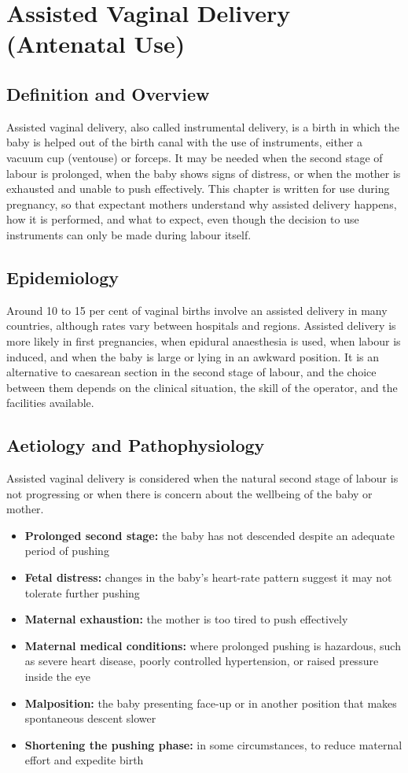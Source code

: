 \chapter{Assisted Vaginal Delivery (Antenatal Use)}

\section*{Definition and Overview}
Assisted vaginal delivery, also called instrumental delivery, is a birth in which the baby is helped out of the birth canal with the use of instruments, either a vacuum cup (ventouse) or forceps. It may be needed when the second stage of labour is prolonged, when the baby shows signs of distress, or when the mother is exhausted and unable to push effectively. This chapter is written for use during pregnancy, so that expectant mothers understand why assisted delivery happens, how it is performed, and what to expect, even though the decision to use instruments can only be made during labour itself.

\section*{Epidemiology}
Around 10 to 15 per cent of vaginal births involve an assisted delivery in many countries, although rates vary between hospitals and regions. Assisted delivery is more likely in first pregnancies, when epidural anaesthesia is used, when labour is induced, and when the baby is large or lying in an awkward position. It is an alternative to caesarean section in the second stage of labour, and the choice between them depends on the clinical situation, the skill of the operator, and the facilities available.

\section*{Aetiology and Pathophysiology}
Assisted vaginal delivery is considered when the natural second stage of labour is not progressing or when there is concern about the wellbeing of the baby or mother.
\begin{itemize}
    \item \textbf{Prolonged second stage:} the baby has not descended despite an adequate period of pushing
    \item \textbf{Fetal distress:} changes in the baby's heart-rate pattern suggest it may not tolerate further pushing
    \item \textbf{Maternal exhaustion:} the mother is too tired to push effectively
    \item \textbf{Maternal medical conditions:} where prolonged pushing is hazardous, such as severe heart disease, poorly controlled hypertension, or raised pressure inside the eye
    \item \textbf{Malposition:} the baby presenting face-up or in another position that makes spontaneous descent slower
    \item \textbf{Shortening the pushing phase:} in some circumstances, to reduce maternal effort and expedite birth
\end{itemize}

